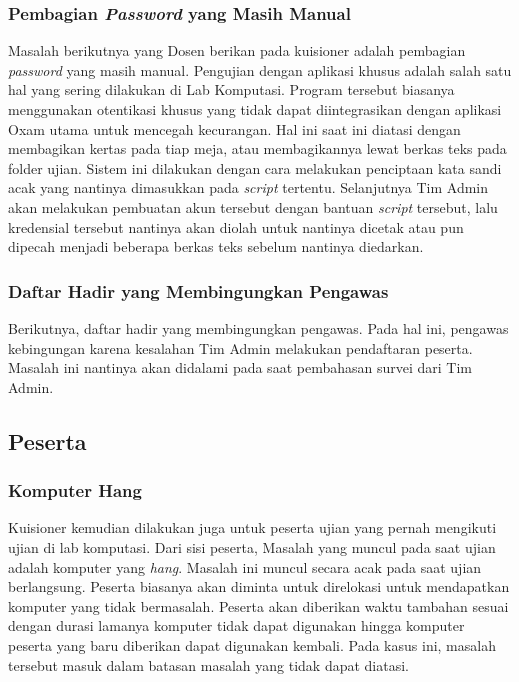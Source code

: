     \subsubsection{Pembagian \textit{Password} yang Masih Manual}\label{ref-prob-dosen-password}
        Masalah berikutnya yang Dosen berikan pada kuisioner adalah pembagian \textit{password} yang masih manual. Pengujian dengan aplikasi khusus adalah salah satu hal yang sering dilakukan di Lab Komputasi. Program tersebut biasanya menggunakan otentikasi khusus yang tidak dapat diintegrasikan dengan aplikasi Oxam utama untuk mencegah kecurangan. Hal ini saat ini diatasi dengan membagikan kertas pada tiap meja, atau membagikannya lewat berkas teks pada folder ujian. Sistem ini dilakukan dengan cara melakukan penciptaan kata sandi acak yang nantinya dimasukkan pada \textit{script} tertentu. Selanjutnya Tim Admin akan melakukan pembuatan akun tersebut dengan bantuan \textit{script} tersebut, lalu kredensial tersebut nantinya akan diolah untuk nantinya dicetak atau pun dipecah menjadi beberapa berkas teks sebelum nantinya diedarkan.

    \subsubsection{Daftar Hadir yang Membingungkan Pengawas}\label{ref-prob-dosen-daftar-hadir}
        Berikutnya, daftar hadir yang membingungkan pengawas. Pada hal ini, pengawas kebingungan karena kesalahan Tim Admin melakukan pendaftaran peserta. Masalah ini nantinya akan didalami pada saat pembahasan survei dari Tim Admin.

\subsection{Peserta}
    \subsubsection{Komputer Hang}\label{ref-prob-peserta-kompu-hang}
    Kuisioner kemudian dilakukan juga untuk peserta ujian yang pernah mengikuti ujian di lab komputasi. Dari sisi peserta, Masalah yang muncul pada saat ujian adalah komputer yang \textit{hang}. Masalah ini muncul secara acak pada saat ujian berlangsung. Peserta biasanya akan diminta untuk direlokasi untuk mendapatkan komputer yang tidak bermasalah. Peserta akan diberikan waktu tambahan sesuai dengan durasi lamanya komputer tidak dapat digunakan hingga komputer peserta yang baru diberikan dapat digunakan kembali. Pada kasus ini, masalah tersebut masuk dalam batasan masalah yang tidak dapat diatasi.
    

